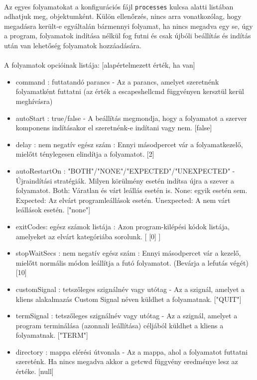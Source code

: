 \documentclass[12pt]{report}
\begin{document}
  \paragraph{}
  Az egyes folyamatokat a konfigurációs fájl \verb|processes| kulcsa alatti listában adhatjuk meg, objektumként. Külön ellenőrzés, nincs arra vonatkozólag, hogy megadásra került-e egyáltalán bármennyi folyamat, ha nincs megadva egy se, úgy a program, folyamatok indítása nélkül fog futni és csak újbóli beállítás és indítás után van lehetőség folyamatok hozzáadására.
    \paragraph{}
  A folyamatok opcióinak listája: [alapértelmezett érték, ha van]
  \begin{itemize}
  \item command : futtatandó parancs - Az a parancs, amelyet szeretnénk folyamatként futtatni (az érték a escapeshellcmd függvényen kersztül kerül meghívásra)
  \item autoStart : true/false - A beállítás megmondja, hogy a folyamatot a szerver komponens indításakor el szeretnénk-e indítani vagy nem. [false]
  \item delay : nem negatív egész szám : Ennyi másodpercet vár a folyamatkezelő, mielőtt ténylegesen elindítja a folyamatot. [2]
  \item autoRestartOn : "BOTH"/"NONE"/"EXPECTED"/"UNEXPECTED" - Újraindítási stratégiák. Milyen körülmény esetén indítsa újra a szever a folyamatot. Both: Váratlan és várt leállás esetén is. None: egyik esetén sem. Expected: Az elvárt programleállások esetén. Unexpected: A nem várt leállások esetén. ["none"]
  \item exitCodes: egész számok listája : Azon program-kilépési kódok listája, amelyeket az elvárt kategóriába sorolunk. [ [0] ]
  \item stopWaitSecs : nem negatív egész szám : Ennyi másodpercet vár a kezelő, mielőtt normális módon leállítja a futó folyamatot. (Bevárja a lefutás végét) [10]
  \item customSignal : tetszőleges szignálnév vagy utótag - Az a szignál, amelyet a kliens alakalmazás Custom Signal néven küldhet a folyamatnak. ["QUIT"]
  \item termSignal : tetszőleges szignálnév vagy utótag - Az a szignál, amelyet a program terminálása (azonnali leállítása) céljából küldhet a kliens a folyamatnak. ["TERM"]
  \item directory : mappa elérési útvonala - Az a mappa, ahol a folyamatot futtatni szereténk. Ha nincs megadva akkor a getcwd függvény eredménye lesz az értéke. [null]

\end{itemize}
\end{document}
